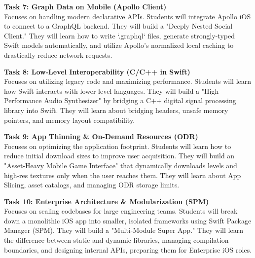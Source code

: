 \vspace{0.3cm}

\noindent\textbf{Task 7: Graph Data on Mobile (Apollo Client)} \\
Focuses on handling modern declarative APIs. Students will integrate Apollo iOS to connect to a GraphQL backend. They will build a "Deeply Nested Social Client." They will learn how to write `.graphql` files, generate strongly-typed Swift models automatically, and utilize Apollo's normalized local caching to drastically reduce network requests.

\vspace{0.3cm}

\noindent\textbf{Task 8: Low-Level Interoperability (C/C++ in Swift)} \\
Focuses on utilizing legacy code and maximizing performance. Students will learn how Swift interacts with lower-level languages. They will build a "High-Performance Audio Synthesizer" by bridging a C++ digital signal processing library into Swift. They will learn about bridging headers, unsafe memory pointers, and memory layout compatibility.

\vspace{0.3cm}

\noindent\textbf{Task 9: App Thinning \& On-Demand Resources (ODR)} \\
Focuses on optimizing the application footprint. Students will learn how to reduce initial download sizes to improve user acquisition. They will build an "Asset-Heavy Mobile Game Interface" that dynamically downloads levels and high-res textures only when the user reaches them. They will learn about App Slicing, asset catalogs, and managing ODR storage limits.

\vspace{0.3cm}

\noindent\textbf{Task 10: Enterprise Architecture \& Modularization (SPM)} \\
Focuses on scaling codebases for large engineering teams. Students will break down a monolithic iOS app into smaller, isolated frameworks using Swift Package Manager (SPM). They will build a "Multi-Module Super App." They will learn the difference between static and dynamic libraries, managing compilation boundaries, and designing internal APIs, preparing them for Enterprise iOS roles.

\newpage
{}